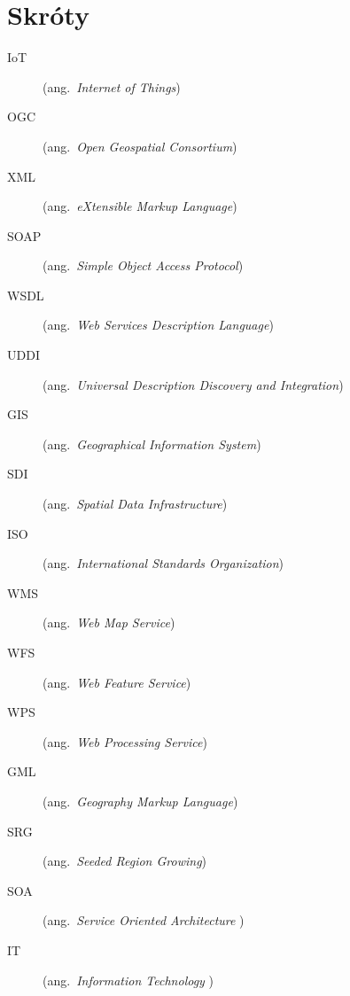 \chapter*{Skróty}\mbox{}
\label{sec:skroty}
\noindent
\begin{description}
	\item [IoT] (ang.\ \emph{Internet of Things})
		
	\item [OGC] (ang.\ \emph{Open Geospatial Consortium}) %
	\item [XML] (ang.\ \emph{eXtensible Markup Language})
	\item [SOAP] (ang.\ \emph{Simple Object Access Protocol})
	\item [WSDL] (ang.\ \emph{Web Services Description Language})
	\item [UDDI] (ang.\ \emph{Universal Description Discovery and Integration})
	\item [GIS] (ang.\ \emph{Geographical Information System})
	\item [SDI] (ang.\ \emph{Spatial Data Infrastructure})
	\item [ISO] (ang.\ \emph{International Standards Organization})
	\item [WMS] (ang.\ \emph{Web Map Service})
	\item [WFS] (ang.\ \emph{Web Feature Service})
	\item [WPS] (ang.\ \emph{Web Processing Service})
	\item [GML] (ang.\ \emph{Geography Markup Language})
	\item [SRG] (ang.\ \emph{Seeded Region Growing})
	\item [SOA] (ang.\ \emph{Service Oriented Architecture })
	\item [IT] (ang.\ \emph{Information Technology })
\end{description}
